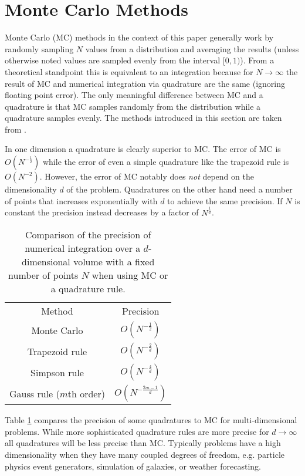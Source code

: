 \section{Monte Carlo Methods}
Monte Carlo (MC) methods in the context of this paper generally work by randomly sampling $N$ values from a distribution
and averaging the results
(unless otherwise noted values are sampled evenly from the interval $[0,1)$).
From a theoretical standpoint this is equivalent to an integration because for $N \rightarrow \infty$ the result of
MC and numerical integration via quadrature are the same (ignoring floating point error).
The only meaningful difference between MC and a quadrature is that MC samples randomly from the distribution
while a quadrature samples evenly.
The methods introduced in this section are taken from \cite{james}.

In one dimension a quadrature is clearly superior to MC.
The error of MC is $O(N^{-\frac{1}{2}})$ while the error of even a simple quadrature like the trapezoid rule is $O(N^{-2})$.
However, the error of MC notably does \textit{not} depend on the dimensionality $d$ of the problem.
Quadratures on the other hand need a number of points that increases exponentially with $d$ to achieve the same precision.
If $N$ is constant the precision instead decreases by a factor of $N^\frac{1}{d}$.
\begin{table}
	\caption{
		Comparison of the precision of numerical integration over a $d$-dimensional volume
		with a fixed number of points $N$ when using MC or a quadrature rule.
	}
	\centering
	\begin{tabular}{cc}
		Method & Precision\\
		Monte Carlo & $O(N^{-\frac{1}{2}})$\\
		Trapezoid rule & $O(N^{-\frac{2}{d}})$\\
		Simpson rule & $O(N^{-\frac{4}{d}})$\\
		Gauss rule ($m$th order) & $O(N^{-\frac{2m-1}{d}})$\\
	\end{tabular}
	\label{tab:mc_vs_quad}
\end{table}
Table \ref{tab:mc_vs_quad} compares the precision of some quadratures to MC for multi-dimensional problems.
While more sophisticated quadrature rules are more precise for $d \rightarrow \infty$ all quadratures will be less precise than MC.
Typically problems have a high dimensionality when they have many coupled degrees of freedom,
e.g. particle physics event generators, simulation of galaxies, or weather forecasting.
